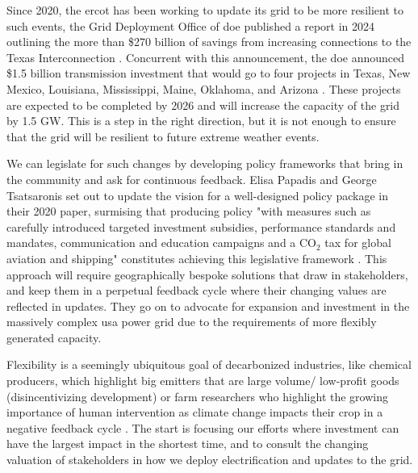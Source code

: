 Since 2020, the \gls{ercot} has been working to update its grid to be more
resilient to such events, the Grid Deployment Office of \gls{doe} published a
report in 2024 outlining the more than \$270 billion of savings from increasing
connections to the Texas Interconnection
\cite{doe_transmission_planning_study_2024}. Concurrent with this announcement,
the \gls{doe} announced \$1.5 billion transmission investment that would go to
four projects in Texas, New Mexico, Louisiana, Mississippi, Maine, Oklahoma,
and Arizona \cite{doe_tran_announce_2024}. These projects are expected to be
completed by 2026 and will increase the capacity of the grid by 1.5 GW. This is
a step in the right direction, but it is not enough to ensure that the grid
will be resilient to future extreme weather events.

We can legislate for such changes by developing policy frameworks that bring in
the community and ask for continuous feedback. Elisa Papadis and George
Tsatsaronis set out to update the vision for a well-designed policy package in
their 2020 paper, surmising that producing policy "with measures such as
carefully introduced targeted investment subsidies, performance standards and
mandates, communication and education campaigns and a CO$_2$ tax for global
aviation and shipping" constitutes achieving this legislative framework
\cite{papadis_challenges_2020}. This approach will require geographically
bespoke solutions that draw in stakeholders, and keep them in a perpetual
feedback cycle where their changing values are reflected in updates. They go on
to advocate for expansion and investment in the massively complex \gls{usa}
power grid due to the requirements of more flexibly generated capacity.

Flexibility is a seemingly ubiquitous goal of decarbonized industries, like
chemical producers, which highlight big emitters that are large volume/
low-profit goods (disincentivizing development)
\cite{mallapragada_decarbonization_2023} or farm researchers who highlight the
growing importance of human intervention as climate change impacts their crop
in a negative feedback cycle \cite{farokhi_soofi_farm_2022}. The start is
focusing our efforts where investment can have the largest impact in the
shortest time, and to consult the changing valuation of stakeholders in how we
deploy electrification and updates to the grid.
